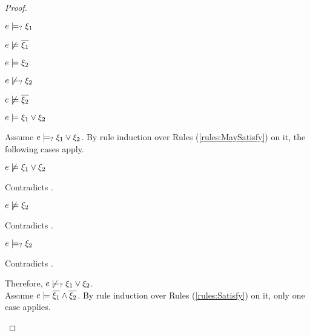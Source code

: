 \begin{proof}
\begin{byCases}
\begin{byCases}
\begin{pfsteps*}
        \item $e \models_{?} \xi_1$  
        \item $e \not\models \overline{\xi_1}$  
        \item $e \models \xi_2$  
        \item $e \not\models_{?} \xi_2$  
        \item $e \not\models \overline{\xi_2}$  
        \item $e \models \xi_1 \vee \xi_2$  
        \end{pfsteps*}
        Assume $e \models_{?} \xi_1 \vee \xi_2$. By rule induction over Rules (\ref{rules:MaySatisfy}) on it, the following cases apply.
        \begin{byCases}
        \item[\text{(\ref{rule:CMSNotVal})}]
            \begin{pfsteps*}
            \item $e \not\models \xi_1 \vee \xi_2$ 
            \end{pfsteps*}
            Contradicts .
        \item[\text{(\ref{rule:CMSOr1})}]
            \begin{pfsteps*}
            \item $e \not\models \xi_2$ 
            \end{pfsteps*}
            Contradicts .
        \item[\text{(\ref{rule:CMSOr2})}]
            \begin{pfsteps*}
            \item $e \models_{?} \xi_2$ 
            \end{pfsteps*}
            Contradicts .
        \end{byCases}
        Therefore, $e \not\models_{?} \xi_1 \vee \xi_2$. \\
        Assume $e \models \overline{\xi_1} \wedge \overline{\xi_2}$. By rule induction over Rules (\ref{rules:Satisfy}) on it, only one case applies.
        \begin{byCases}

\end{byCases}
\end{byCases}
\end{byCases}
\end{proof}
